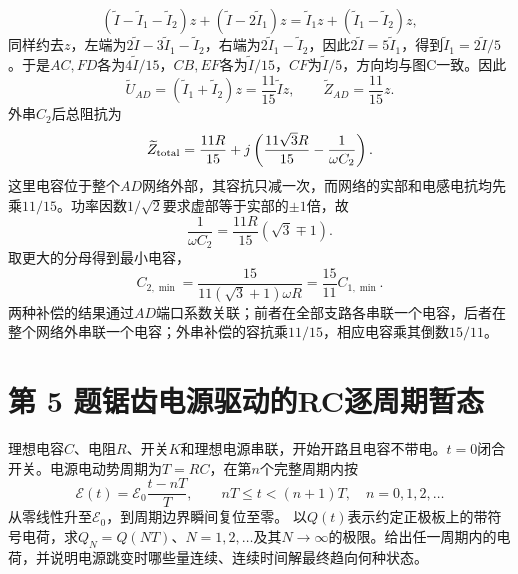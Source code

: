 \documentclass[UTF8,fontset=fandol,a4paper,11pt]{ctexart}
\begin{document}
\[
(\widetilde I-\widetilde I_1-\widetilde I_2)z
+(\widetilde I-2\widetilde I_1)z
=\widetilde I_1z+(\widetilde I_1-\widetilde I_2)z,
\]
同样约去$z$，左端为$2\widetilde I-3\widetilde I_1-\widetilde I_2$，右端为$2\widetilde I_1-\widetilde I_2$，因此$2\widetilde I=5\widetilde I_1$，得到$\widetilde I_1=2\widetilde I/5$。于是$AC,FD$各为$4\widetilde I/15$，$CB,EF$各为$\widetilde I/15$，$CF$为$\widetilde I/5$，方向均与图C一致。因此
\[
\widetilde U_{AD}=(\widetilde I_1+\widetilde I_2)z
=\frac{11}{15}\widetilde I z,\qquad
\boxed{\widetilde Z_{AD}=\frac{11}{15}z}.
\]
外串$C_2$后总阻抗为
\[
\widetilde Z_{\rm total}
=\frac{11R}{15}
+j\left(\frac{11\sqrt3R}{15}-\frac1{\omega C_2}\right).
\]
这里电容位于整个$AD$网络外部，其容抗只减一次，而网络的实部和电感电抗均先乘$11/15$。功率因数$1/\sqrt2$要求虚部等于实部的$\pm1$倍，故
\[
\frac1{\omega C_2}
=\frac{11R}{15}(\sqrt3\mp1).
\]
取更大的分母得到最小电容，
\[
\boxed{C_{2,\min}
=\frac{15}{11(\sqrt3+1)\omega R}
=\frac{15}{11}C_{1,\min}}.
\]
两种补偿的结果通过$AD$端口系数关联；前者在全部支路各串联一个电容，后者在整个网络外串联一个电容；外串补偿的容抗乘$11/15$，相应电容乘其倒数$15/11$。




\section*{第 5 题\quad 锯齿电源驱动的RC逐周期暂态}\label{q:5}


理想电容$C$、电阻$R$、开关$K$和理想电源串联，开始开路且电容不带电。$t=0$闭合开关。电源电动势周期为$T=RC$，在第$n$个完整周期内按
\[
\mathcal E(t)=\mathcal E_0\frac{t-nT}{T},
\qquad nT\le t<(n+1)T,\quad n=0,1,2,\ldots
\]
从零线性升至$\mathcal E_0$，到周期边界瞬间复位至零。
以$Q(t)$表示约定正极板上的带符号电荷，求$Q_N=Q(NT)$、$N=1,2,\ldots$及其$N\to\infty$的极限。给出任一周期内的电荷，并说明电源跳变时哪些量连续、连续时间解最终趋向何种状态。
\end{document}
